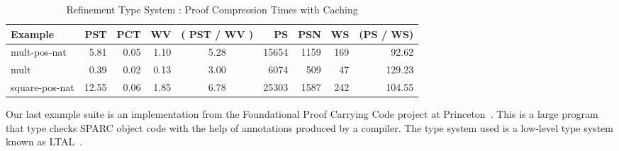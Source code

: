 \documentclass{llncs}
\begin{document}
\begin{table*}[htbp]
\begin{center}
\begin{small}
\begin{tabular}{|l|r|r|r|c|r|r|r|r|}
\hline
Example & PST 
& PCT & WV & ( PST / WV ) & PS & PSN & WS & (PS / WS)\\
\hline
mult-pos-nat & 5.81 & 0.05 & 1.10 & 5.28
& 15654 & 1159 & 169 & 92.62\\
mult & 0.39 & 0.02 & 0.13 & 3.00 
& 6074 & 509 & 47 & 129.23\\
square-pos-nat & 12.55 & 0.06 & 1.85 & 6.78 
& 25303 & 1587 & 242 & 104.55\\
\hline
\end{tabular}
\end{small}
\end{center}
\caption{\label{tab:reftimes} Refinement Type System : 
Proof Compression Times with Caching}
\end{table*}

Our last example suite is an implementation from the Foundational 
Proof Carrying Code project at Princeton~\cite{Appel01lics}. This 
is a large program that type checks SPARC object code with the help 
of annotations produced by a compiler. The type system used is a
low-level type system known as LTAL~\cite{chen+:fpcc-ltal}.
\end{document}
